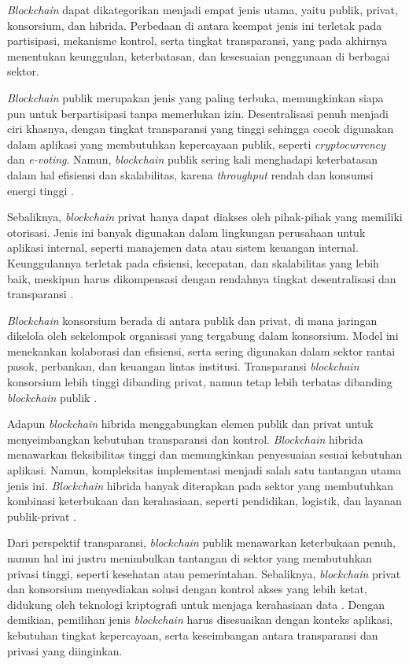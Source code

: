 \textit{Blockchain} dapat dikategorikan menjadi empat jenis utama, yaitu publik, privat, konsorsium, dan hibrida. Perbedaan di antara keempat jenis ini terletak pada partisipasi, mekanisme kontrol, serta tingkat transparansi, yang pada akhirnya menentukan keunggulan, keterbatasan, dan kesesuaian penggunaan di berbagai sektor.

\textit{Blockchain} publik merupakan jenis yang paling terbuka, memungkinkan siapa pun untuk berpartisipasi tanpa memerlukan izin. Desentralisasi penuh menjadi ciri khasnya, dengan tingkat transparansi yang tinggi sehingga cocok digunakan dalam aplikasi yang membutuhkan kepercayaan publik, seperti \textit{cryptocurrency} dan \textit{e-voting}. Namun, \textit{blockchain} publik sering kali menghadapi keterbatasan dalam hal efisiensi dan skalabilitas, karena \textit{throughput} rendah dan konsumsi energi tinggi \cite{dong2023, habib2022, pakseresht2024}.

Sebaliknya, \textit{blockchain} privat hanya dapat diakses oleh pihak-pihak yang memiliki otorisasi. Jenis ini banyak digunakan dalam lingkungan perusahaan untuk aplikasi internal, seperti manajemen data atau sistem keuangan internal. Keunggulannya terletak pada efisiensi, kecepatan, dan skalabilitas yang lebih baik, meskipun harus dikompensasi dengan rendahnya tingkat desentralisasi dan transparansi \cite{dong2023, habib2022, pakseresht2024}.

\textit{Blockchain} konsorsium berada di antara publik dan privat, di mana jaringan dikelola oleh sekelompok organisasi yang tergabung dalam konsorsium. Model ini menekankan kolaborasi dan efisiensi, serta sering digunakan dalam sektor rantai pasok, perbankan, dan keuangan lintas institusi. Transparansi \textit{blockchain} konsorsium lebih tinggi dibanding privat, namun tetap lebih terbatas dibanding \textit{blockchain} publik \cite{dong2023, sedlmeir2022}.

Adapun \textit{blockchain} hibrida menggabungkan elemen publik dan privat untuk menyeimbangkan kebutuhan transparansi dan kontrol. \textit{Blockchain} hibrida menawarkan fleksibilitas tinggi dan memungkinkan penyesuaian sesuai kebutuhan aplikasi. Namun, kompleksitas implementasi menjadi salah satu tantangan utama jenis ini. \textit{Blockchain} hibrida banyak diterapkan pada sektor yang membutuhkan kombinasi keterbukaan dan kerahasiaan, seperti pendidikan, logistik, dan layanan publik-privat \cite{sedlmeir2022}.

Dari perspektif transparansi, \textit{blockchain} publik menawarkan keterbukaan penuh, namun hal ini justru menimbulkan tantangan di sektor yang membutuhkan privasi tinggi, seperti kesehatan atau pemerintahan. Sebaliknya, \textit{blockchain} privat dan konsorsium menyediakan solusi dengan kontrol akses yang lebih ketat, didukung oleh teknologi kriptografi untuk menjaga kerahasiaan data \cite{habib2022, sedlmeir2022, pakseresht2024}. Dengan demikian, pemilihan jenis \textit{blockchain} harus disesuaikan dengan konteks aplikasi, kebutuhan tingkat kepercayaan, serta keseimbangan antara transparansi dan privasi yang diinginkan.

